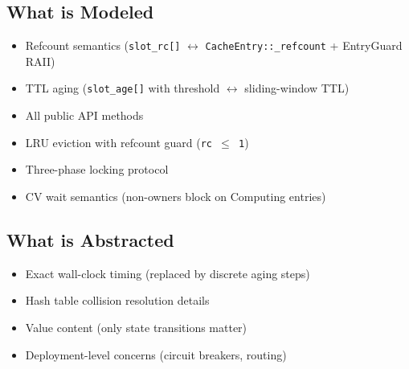 \documentclass[11pt,a4paper]{article}
\begin{document}
\subsection{What is Modeled}

\begin{itemize}
\item Refcount semantics (\texttt{slot\_rc[]} $\leftrightarrow$
      \texttt{CacheEntry::\_refcount} + EntryGuard RAII)
\item TTL aging (\texttt{slot\_age[]} with threshold $\leftrightarrow$
      sliding-window TTL)
\item All public API methods
\item LRU eviction with refcount guard (\texttt{rc $\leq$ 1})
\item Three-phase locking protocol
\item CV wait semantics (non-owners block on Computing entries)
\end{itemize}

\subsection{What is Abstracted}

\begin{itemize}
\item Exact wall-clock timing (replaced by discrete aging steps)
\item Hash table collision resolution details
\item Value content (only state transitions matter)
\item Deployment-level concerns (circuit breakers, routing)
\end{itemize}
\end{document}
